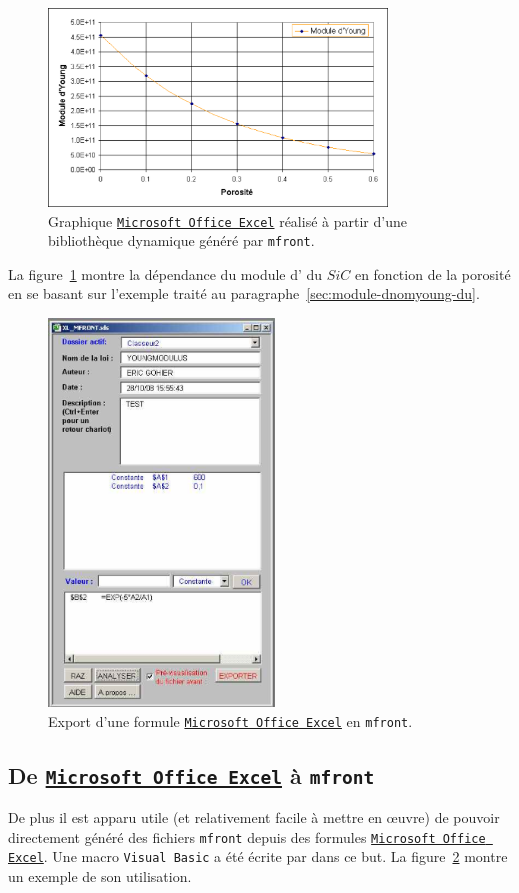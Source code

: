 \documentclass[rectoverso,pleiades,pstricks,leqno,anti]{texmf/note_technique_2010}
\newcommand{\mfront}{\texttt{mfront}}
\newcommand{\sic}{$SiC$}
\newcommand{\excel}{\href{http://www.microsoft.com/france/office/2007/programs/excel/overview.mspx}{\texttt{Microsoft Office Excel}}}
\begin{document}
\begin{figure}[htbp]
  \centering
  \includegraphics[width=9cm]{Images/mfrontexcel.eps}
  \caption{Graphique \excel{} réalisé à partir d'une
    bibliothèque dynamique généré par \mfront{}.}
  \label{fig:mfrontexcel}
\end{figure}

La figure~\ref{fig:mfrontexcel} montre la dépendance du module
d' du \sic{} en fonction de la porosité en se basant
sur l'exemple traité au paragraphe~\ref{sec:module-dnomyoung-du}.

\begin{figure}[htbp]
  \centering
  \includegraphics[width=6cm]{Images/mfront.eps}
  \caption{Export d'une formule \excel{} en \mfront{}.}
  \label{fig:exceltomfront}
\end{figure}

\subsection{De \excel{} à \mfront{}} De plus il est apparu utile (et
relativement facile à mettre en \oe{}uvre) de pouvoir directement généré
des fichiers \mfront{} depuis des formules \excel{}. Une macro
\texttt{Visual Basic} a été écrite par  dans ce but. La
figure~\ref{fig:exceltomfront} montre un exemple de son utilisation.
\end{document}
